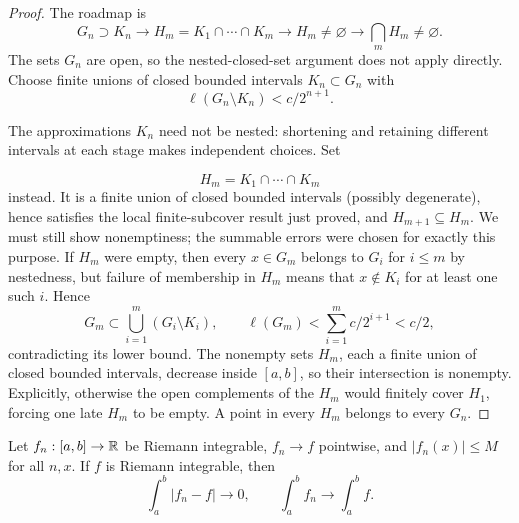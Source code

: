 \begin{proof}
The roadmap is
\[
G_n\supset K_n\longrightarrow H_m=K_1\cap\cdots\cap K_m
\longrightarrow H_m\ne\varnothing
\longrightarrow\bigcap_mH_m\ne\varnothing.
\]
The sets \(G_n\) are open, so the nested-closed-set argument does not apply
directly. Choose finite unions of closed bounded intervals
$K_n\subset G_n$ with
\[
\ell(G_n\setminus K_n)<c/2^{n+1}.
\]

The approximations $K_n$ need not be nested: shortening and retaining
different intervals at each stage makes independent choices. Set

\[
H_m=K_1\cap\cdots\cap K_m
\]
 instead. It is a finite union of closed bounded intervals (possibly
degenerate), hence satisfies the local finite-subcover result just proved,
and $H_{m+1}\subseteq H_m$. We must still show
nonemptiness; the summable errors were chosen for exactly this purpose.
If $H_m$ were empty, then every $x\in G_m$ belongs to $G_i$ for $i\leq m$
by nestedness, but failure of membership in $H_m$ means that $x\notin K_i$
for at least one such $i$. Hence
\[
G_m\subset\bigcup_{i=1}^m(G_i\setminus K_i),\qquad
\ell(G_m)<\sum_{i=1}^m c/2^{i+1}<c/2,
\]
contradicting its lower bound. The nonempty sets \(H_m\), each a finite
union of closed bounded intervals, decrease inside \([a,b]\), so their
intersection is nonempty. Explicitly, otherwise
the open complements of the $H_m$ would finitely cover $H_1$, forcing
one late $H_m$ to be empty. A point in every $H_m$ belongs to every $G_n$.
\end{proof}
\begin{theorem}
\label{thm:arzela-bounded-riemann}
Let $f_n:[a,b]\to\mathbb{R}$ be Riemann integrable, $f_n\to f$ pointwise,
and $|f_n(x)|\leq M$ for all $n,x$. If $f$ is Riemann integrable,
then
\[
\int_a^b|f_n-f|\longrightarrow0,\qquad
\int_a^b f_n\longrightarrow\int_a^b f.
\]
\end{theorem}
